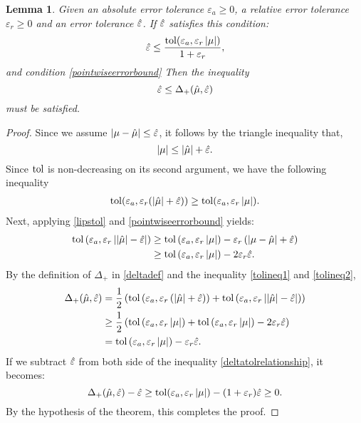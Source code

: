 \documentclass{iitthesis}
\newtheorem{lemma}[theorem]{Lemma}
\theoremstyle{definition}
\begin{document}
\begin{lemma}\label{cost2}
Given an absolute error tolerance $\varepsilon_a \geq 0$, a relative error tolerance $\varepsilon_r \geq 0$ and an error tolerance $\hat{\varepsilon}$. If $\hat{\varepsilon}$ satisfies this condition: $$ \hat{\varepsilon} \leq \frac{\operatorname{tol}(\varepsilon_a, \varepsilon_r\left \lvert \mu \right \rvert)}{1+\varepsilon_r}, $$ and condition \eqref{pointwiseerrorbound}
Then the inequality $$\hat{\varepsilon} \leq \Delta_{+}(\hat{\mu},\hat{\varepsilon})$$ must be satisfied.
\end{lemma}
\begin{proof}
Since we assume $\left \lvert \mu -\hat{\mu} \right \rvert\leq \hat{\varepsilon}$, it follows by the triangle inequality that,
 $$\left \lvert \mu \right \rvert \leq\left \lvert \hat{\mu} \right \rvert+\hat{\varepsilon}.$$
Since $\operatorname{tol}$ is non-decreasing on its second argument, we have the following inequality
\begin{align}\label{tolineq1}
\operatorname{tol}(\varepsilon_a, \varepsilon_r (\left \lvert \hat{\mu} \right \rvert+\hat{\varepsilon}))  \geq \operatorname{tol}(\varepsilon_a, \varepsilon_r \left \lvert \mu \right \rvert).
\end{align}
Next, applying \eqref{lipstol} and \eqref{pointwiseerrorbound} yields:
\begin{align}
\operatorname{tol}\left(\varepsilon_a, \varepsilon_r \left \lvert \left \lvert \hat{\mu} \right \rvert-\hat{\varepsilon} \right \rvert\right)  
 &\geq \operatorname{tol}\left(\varepsilon_a, \varepsilon_r \left \lvert \mu \right \rvert\right) - \varepsilon_r\left(\left \lvert \mu-\hat{\mu} \right \rvert+\hat{\varepsilon}\right) \nonumber\\&
 \geq  \operatorname{tol}\left(\varepsilon_a, \varepsilon_r \left \lvert \mu \right \rvert\right) - 2\varepsilon_r\hat{\varepsilon}. \label{tolineq2}
\end{align}
By the definition of $\Delta_{+}$ in \eqref{deltadef} and the inequality \eqref{tolineq1} and \eqref{tolineq2},
 \begin{align}
\Delta_{+}(\hat{\mu}, \hat{\varepsilon}) &= \frac{1}{2} \left ( \operatorname{tol}\left(\varepsilon_a, \varepsilon_r \left(\left \lvert \hat{\mu} \right \rvert+\hat{\varepsilon}\right)\right) +\operatorname{tol}\left(\varepsilon_a, \varepsilon_r \left \lvert \left \lvert \hat{\mu} \right \rvert-\hat{\varepsilon} \right \rvert\right) \right) \nonumber\\&
\geq \frac{1}{2} \left( \operatorname{tol}\left(\varepsilon_a,\varepsilon_r \left \lvert \mu \right \rvert\right) + \operatorname{tol}\left(\varepsilon_a, \varepsilon_r \left \lvert \mu \right \rvert\right) - 2\varepsilon_r\hat{\varepsilon} \right)\nonumber\\& =  \operatorname{tol}\left(\varepsilon_a, \varepsilon_r \left \lvert \mu \right \rvert\right) - \varepsilon_r\hat{\varepsilon}.\label{deltatolrelationship}
\end{align}
If we subtract $\hat{\varepsilon}$ from both side of the inequality \eqref{deltatolrelationship}, it becomes:
$$\Delta_{+}(\hat{\mu}, \hat{\varepsilon}) -\hat{\varepsilon} \geq \operatorname{tol}(\varepsilon_a,\varepsilon_r \left \lvert \mu \right \rvert)-(1+\varepsilon_r)\hat{\varepsilon} \geq 0.$$
By the hypothesis of the theorem, this completes the proof.
\end{proof}
\end{document}
